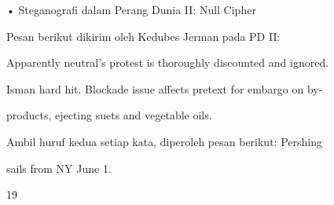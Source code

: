\documentclass{article}
\begin{document}

• Steganografi dalam Perang Dunia II: Null Cipher

 Pesan berikut dikirim oleh Kedubes Jerman pada PD II:

 Apparently neutral's protest is thoroughly discounted and ignored. 

Isman hard hit. Blockade issue affects pretext for embargo on by-

products, ejecting suets and vegetable oils. 

 Ambil huruf kedua setiap kata, diperoleh pesan berikut: Pershing 

sails from NY June 1. 

19
\end{document}
